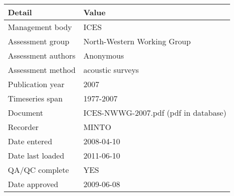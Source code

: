 \begin{table}[htb]
\centering
\begin{tabular}{ll}
\toprule
Detail & Value \\
\midrule
Management body    & ICES                                 \\
Assessment group   & North-Western Working Group          \\
Assessment authors & Anonymous                            \\
Assessment method  & acoustic surveys                     \\
Publication year   & 2007                                 \\
Timeseries span    & 1977-2007                            \\
Document           & ICES-NWWG-2007.pdf (pdf in database) \\
Recorder           & MINTO                                \\
Date entered       & 2008-04-10                           \\
Date last loaded   & 2011-06-10                           \\
QA/QC complete     & YES                                  \\
Date approved      & 2009-06-08                           \\
\bottomrule
\end{tabular}
\label{tab:assessdet}
\end{table}
